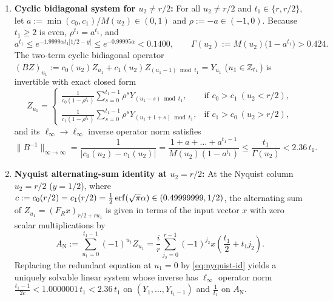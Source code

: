 \begin{theorem}
\begin{enumerate}[label=\textbf{\arabic*.},leftmargin=*]
  \item \textbf{Cyclic bidiagonal system for $u_2 \ne r/2$:} For all $u_2 \ne r/2$ and $t_1 \in \{r, r/2\}$, let $a := \min(c_0, c_1) / M(u_2) \in (0, 1)$ and $\rho := -a \in (-1, 0)$. Because $t_1 \ge 2$ is even, $\rho^{t_1} = a^{t_1}$, and
  \begin{equation}\label{eq:wrap-bound}
    a^{t_1} \le e^{-1.9999 \alpha t_1 |1/2 - y|} \le e^{-0.99995 \alpha} < 0.1400, \qquad \Gamma(u_2) := M(u_2)\bigl(1 - a^{t_1}\bigr) > 0.424.
  \end{equation}
  The two-term cyclic bidiagonal operator $(B Z)_{u_1} := c_0(u_2) Z_{u_1} + c_1(u_2) Z_{(u_1 - 1)\bmod t_1} = Y_{u_1}$ ($u_1 \in \mathbb{Z}_{t_1}$) is invertible with exact closed form
  \begin{equation}\label{eq:closed-form-B}
    Z_{u_1} = \begin{cases}
      \displaystyle \frac{1}{c_0(1 - \rho^{t_1})} \sum_{s=0}^{t_1-1} \rho^s Y_{(u_1 - s)\bmod t_1}, & \text{if } c_0 > c_1 \ (u_2 < r/2), \\[10pt]
      \displaystyle \frac{1}{c_1(1 - \rho^{t_1})} \sum_{s=0}^{t_1-1} \rho^s Y_{(u_1 + 1 + s)\bmod t_1}, & \text{if } c_1 > c_0 \ (u_2 > r/2),
    \end{cases}
  \end{equation}
  and its $\ell_\infty \to \ell_\infty$ inverse operator norm satisfies
  \begin{equation}\label{eq:B-inv-norm}
    \|B^{-1}\|_{\infty \to \infty} = \frac{1}{|c_0(u_2) - c_1(u_2)|} = \frac{1 + a + \dots + a^{t_1-1}}{M(u_2)(1 - a^{t_1})} \le \frac{t_1}{\Gamma(u_2)} < 2.36 \, t_1.
  \end{equation}

  \item \textbf{Nyquist alternating-sum identity at $u_2 = r/2$:} At the Nyquist column $u_2 = r/2$ ($y = 1/2$), where $c := c_0(r/2) = c_1(r/2) = \frac{1}{2}\operatorname{erf}(\sqrt{\pi}\alpha) \in (0.49999999, 1/2)$, the alternating sum of $Z_{u_1} = (F_R x)_{r/2 + r u_1}$ is given in terms of the input vector $x$ with zero scalar multiplications by
  \begin{equation}\label{eq:nyquist-id}
    A_{\mathrm{N}} := \sum_{u_1=0}^{t_1-1} (-1)^{u_1} Z_{u_1} = \frac{i}{r} \sum_{j_2=0}^{r-1} (-1)^{j_2} x\!\left(\frac{t_1}{2} + t_1 j_2\right).
  \end{equation}
  Replacing the redundant equation at $u_1 = 0$ by \eqref{eq:nyquist-id} yields a uniquely solvable linear system whose inverse has $\ell_\infty$ operator norm $\frac{t_1 - 1}{2c} < 1.0000001 \, t_1 < 2.36 \, t_1$ on $(Y_1, \dots, Y_{t_1-1})$ and $\frac{1}{t_1}$ on $A_{\mathrm{N}}$.
\end{enumerate}
\end{theorem}

